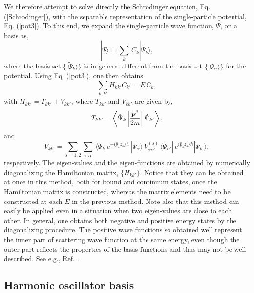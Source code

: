 \documentclass[superscriptaddress,twocolumn,amsmath,amssymb]{revtex4}
\renewcommand{\vec}[1]{\mbox{\boldmath $#1$}}
\begin{document}
We therefore attempt to solve directly 
the Schr\"odinger equation, Eq. (\ref{Schrodinger}), with the separable 
representation of the single-particle potential, Eq. (\ref{pot3}). 
To this end, we expand the single-particle wave function, $\Psi$, 
on a basis as, 
%
\begin{equation}
|\Psi\rangle = \sum_k\,C_k|\tilde{\Psi}_k\rangle, 
\end{equation}
%
where the basis set $\{|\tilde{\Psi}_k\rangle\}$ is in general different 
from the basis set $\{|\Psi_\alpha\rangle\}$ for the 
potential. 
Using Eq. (\ref{pot3}), one then obtains 
%
\begin{equation}
\sum_{k,k'}H_{kk'}C_{k'}=E\,C_k, 
\end{equation}
%
with $H_{kk'}=T_{kk'}+V_{kk'}$, where $T_{kk'}$ and $V_{kk'}$ are given by, 
%
\begin{equation}
T_{kk'}=\left\langle\tilde{\Psi}_k\left| 
\frac{\vec{p}^2}{2m}\right|\tilde{\Psi}_{k'}\right\rangle,
\label{T}
\end{equation}
%
and
%
\begin{equation}
V_{kk'}=\sum_{s=1,2}
\sum_{\alpha,\alpha'}\,
\langle\tilde{\Psi}_k|e^{-i\hat{p}_zz_s/\hbar}\,|\Psi_\alpha\rangle \,
V_{\alpha\alpha'}^{(s)}
\,\langle \Psi_{\alpha'}|\,e^{i\hat{p}_zz_s/\hbar}|\tilde{\Psi}_{k'}\rangle,
\label{V}
\end{equation}
%
respectively. 
The eigen-values and the eigen-functions are obtained by numerically 
diagonalizing the Hamiltonian matrix, $\{H_{kk'}\}$. 
Notice that they can be obtained at once in this method, both for 
bound and continuum states, once the Hamiltonian 
matrix is constructed, 
whereas the matrix elements need to be constructed at each $E$ in the 
previous method. 
Note also that this method can easily be applied even in a situation 
when two eigen-values are close to each other. 
In general, one obtains both negative and positive energy 
states by the diagonalizing procedure. 
The positive wave functions 
so obtained well represent the inner part of scattering 
wave function at the same energy, even though the outer part reflects 
the properties of the basis functions and thus may not be well 
described. See e.g., Ref. \cite{HT70}. 

\subsection{Harmonic oscillator basis}
\end{document}

